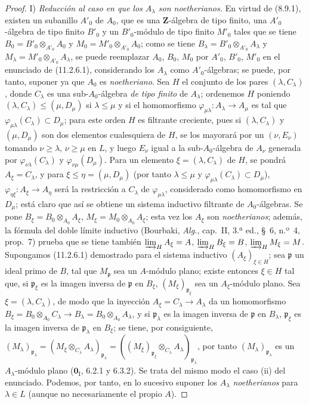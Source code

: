 \begin{proof}
\medskip
\noindent I) \emph{Reducción al caso en que los $A_\lambda$ son
noetherianos.} En virtud de (8.9.1), existen un subanillo $A'_0$ de $A_0$,
que es una $\mathbf Z$-álgebra de tipo finito, una $A'_0$-álgebra de tipo finito
$B'_0$ y un $B'_0$-módulo de tipo finito $M'_0$ tales que se tiene
$B_0=B'_0\otimes_{A'_0}A_0$ y $M_0=M'_0\otimes_{A'_0}A_0$; como se tiene
$B_\lambda=B'_0\otimes_{A'_0}A_\lambda$ y
$M_\lambda=M'_0\otimes_{A'_0}A_\lambda$, se puede reemplazar $A_0$, $B_0$,
$M_0$ por $A'_0$, $B'_0$, $M'_0$ en el enunciado de (11.2.6.1), considerando
los $A_\lambda$ como $A'_0$-álgebras; se puede, por tanto, suponer ya que
$A_0$ es \emph{noetheriano}. Sea $H$ el conjunto de los pares
$(\lambda,C_\lambda)$, donde $C_\lambda$ es una sub-$A_0$-álgebra \emph{de
tipo finito} de $A_\lambda$; ordenemos $H$ poniendo
$(\lambda,C_\lambda)\leq(\mu,D_\mu)$ si $\lambda\leq\mu$ y si
el homomorfismo $\varphi_{\mu\lambda}:A_\lambda\to A_\mu$ es tal que
$\varphi_{\mu\lambda}(C_\lambda)\subset D_\mu$; para este orden $H$ es
filtrante creciente, pues si $(\lambda,C_\lambda)$ y $(\mu,D_\mu)$ son dos
elementos cualesquiera de $H$, se los mayorará por un $(\nu,E_\nu)$ tomando
$\nu\geq\lambda$, $\nu\geq\mu$ en $L$, y luego $E_\nu$ igual a la
sub-$A_0$-álgebra de $A_\nu$ generada por
$\varphi_{\nu\lambda}(C_\lambda)$ y $\varphi_{\nu\mu}(D_\mu)$. Para un
elemento $\xi=(\lambda,C_\lambda)$ de $H$, se pondrá $A_\xi=C_\lambda$, y
para $\xi\leq\eta=(\mu,D_\mu)$ (por tanto $\lambda\leq\mu$ y
$\varphi_{\mu\lambda}(C_\lambda)\subset D_\mu$),
$\varphi_{\eta\xi}:A_\xi\to A_\eta$ será la restricción a $C_\lambda$ de
$\varphi_{\mu\lambda}$, considerado como homomorfismo en $D_\mu$; está
claro que así se obtiene un sistema inductivo filtrante de $A_0$-álgebras.
Se pone $B_\xi=B_0\otimes_{A_0}A_\xi$,
$M_\xi=M_0\otimes_{A_0}A_\xi$; esta vez los $A_\xi$ son
\emph{noetherianos}; además, la fórmula del doble límite inductivo (Bourbaki,
\emph{Alg.}, cap.~II, 3.ª ed., \S~6, n.º~4, prop.~7) prueba que
se tiene también
$\varinjlim_HA_\xi=A$, $\varinjlim_HB_\xi=B$,
$\varinjlim_HM_\xi=M$. Supongamos (11.2.6.1) demostrado para el sistema inductivo
$(A_\xi)_{\xi\in H}$; sea $\mathfrak p$ un ideal primo de $B$,
tal que $M_{\mathfrak p}$ sea un $A$-módulo plano; existe entonces
$\xi\in H$ tal que, si $\mathfrak p_\xi$ es la imagen
inversa de
$\mathfrak p$ en $B_\xi$, $(M_\xi)_{\mathfrak p_\xi}$ sea un
$A_\xi$-módulo plano. Sea $\xi=(\lambda,C_\lambda)$, de modo que
la inyección $A_\xi=C_\lambda\to A_\lambda$ da un homomorfismo
$B_\xi=B_0\otimes_{A_0}C_\lambda\to B_\lambda=B_0\otimes_{A_0}A_\lambda$,
y si $\mathfrak p_\lambda$ es la imagen inversa de $\mathfrak p$ en
$B_\lambda$, $\mathfrak p_\xi$ es la imagen inversa de
$\mathfrak p_\lambda$ en $B_\xi$; se tiene, por consiguiente,
$(M_\lambda)_{\mathfrak p_\lambda}
=(M_\xi\otimes_{C_\lambda}A_\lambda)_{\mathfrak p_\lambda}
=((M_\xi)_{\mathfrak p_\xi}\otimes_{C_\lambda}A_\lambda)_{\mathfrak p_\lambda}$,
por tanto $(M_\lambda)_{\mathfrak p_\lambda}$ es un $A_\lambda$-módulo plano
($\mathbf 0_{\mathrm I}$, 6.2.1 y 6.3.2). Se trata del mismo modo el caso (ii) del
enunciado. Podemos, por tanto, en lo sucesivo suponer los $A_\lambda$
\emph{noetherianos} para $\lambda\in L$ (aunque no necesariamente el propio $A$).


\end{proof}
